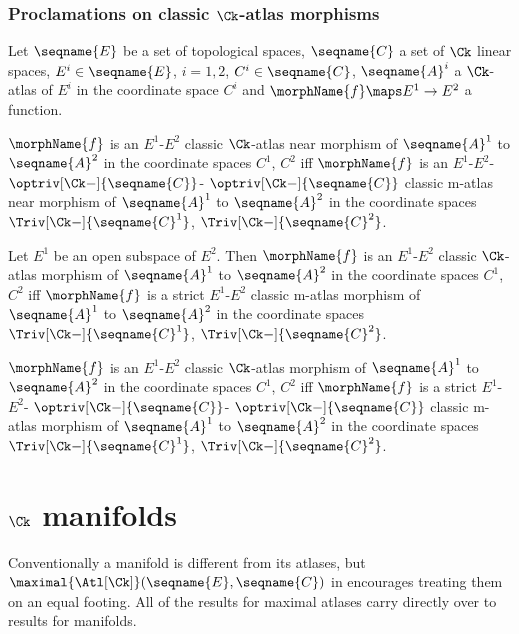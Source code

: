 \documentclass{article}
\begin{document}
\subsubsection{Proclamations on classic \ensuremath{\Ck}-atlas morphisms}
\begin{lemma}
\label{lem:Ck-ATLcmorph}
Let $\seqname{E}$ be a set of topological spaces, $\seqname{C}$ a set of
$\Ck$ linear spaces, $E^i \in \seqname{E}$, $i=1,2$,
$C^i \in \seqname{C}$, $\seqname{A}^i$ a $\Ck$-atlas of $E^i$ in the
coordinate space $C^i$ and $\morphName{f} \maps E^1 \to E^2$ a function.

$\morphName{f}$ is an
$E^1$-$E^2$ classic $\Ck$-atlas near morphism of $\seqname{A}^1$ to
$\seqname{A}^2$ in the coordinate spaces $C^1$, $C^2$ iff $\morphName{f}$
is an
$E^1$-$E^2$-%
$\optriv[\Ck-]{\seqname{C}}$-%
$\optriv[\Ck-]{\seqname{C}}$
classic m-atlas near morphism of $\seqname{A}^1$ to $\seqname{A}^2$ in
the coordinate spaces $\Triv[\Ck-]{\seqname{C}^1}$,
$\Triv[\Ck-]{\seqname{C}^2}$.

Let $E^1$ be an open subspace of $E^2$. Then $\morphName{f}$ is an
$E^1$-$E^2$ classic $\Ck$-atlas morphism of $\seqname{A}^1$ to
$\seqname{A}^2$ in the coordinate spaces $C^1$, $C^2$ iff $\morphName{f}$
is a strict $E^1$-$E^2$ classic m-atlas morphism of $\seqname{A}^1$ to
$\seqname{A}^2$ in the coordinate spaces $\Triv[\Ck-]{\seqname{C}^1}$,
$\Triv[\Ck-]{\seqname{C}^2}$.

$\morphName{f}$ is an $E^1$-$E^2$ classic $\Ck$-atlas morphism of
$\seqname{A}^1$ to $\seqname{A}^2$ in the coordinate spaces $C^1$, $C^2$
iff $\morphName{f}$ is a strict
$E^1$-$E^2$-%
$\optriv[\Ck-]{\seqname{C}}$-%
$\optriv[\Ck-]{\seqname{C}}$
classic m-atlas morphism of $\seqname{A}^1$ to $\seqname{A}^2$ in the
coordinate spaces $\Triv[\Ck-]{\seqname{C}^1}$,
$\Triv[\Ck-]{\seqname{C}^2}$.


\end{lemma}

\section {$\Ck$ manifolds}
\label{sec:ckman}
Conventionally a manifold is different from its atlases, but
$\maximal{\Atl[\Ck]}(\seqname{E}, \seqname{C})$ in
 encourages treating them on an equal footing.
All of the results for maximal atlases carry directly over to results
for manifolds.
\end{document}
